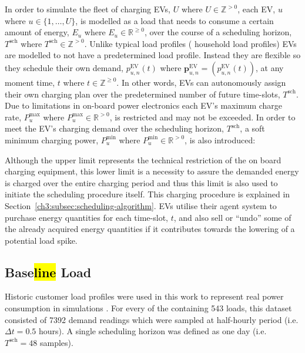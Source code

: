 In order to simulate the fleet of charging EVs, $U$ where $U \in \mathbb{Z}^{>0}$, each EV, $u$ where $u \in \{1, \dots, U\}$, is modelled as a load that needs to consume a certain amount of energy, $E_u$ where $E_u \in \mathbb{R}^{\geq0}$, over the course of a scheduling horizon, $T^\text{sch}$ where $T^\text{sch} \in \mathbb{Z}^{>0}$.
Unlike typical load profiles ( household load profiles) EVs are modelled to not have a predetermined load profile.
Instead they are flexible so they schedule their own demand, $p^\text{EV}_{u,n}(t)$ where $\textbf{p}^\text{EV}_{u,n} = (p^\text{EV}_{u,n}(t))$, at any moment time, $t$ where $t \in \mathbb{Z}^{\geq0}$.
In other words, EVs can autonomously assign their own charging plan over the predetermined number of future time-slots, $T^\text{sch}$.
Due to limitations in on-board power electronics each EV's maximum charge rate, $P^\text{max}_{u}$ where $P^\text{max}_{u} \in \mathbb{R}^{>0}$, is restricted and may not be exceeded.
In order to meet the EV's charging demand over the scheduling horizon, $T^\text{sch}$, a soft minimum charging power, $P^\text{min}_{u}$ where $P^\text{min}_{u} \in \mathbb{R}^{>0}$, is also introduced:



Although the upper limit represents the technical restriction of the on board charging equipment, this lower limit is a necessity to assure the demanded energy is charged over the entire charging period and thus this limit is also used to initiate the scheduling procedure itself.
This charging procedure is explained in Section~\ref{ch3:subsec:scheduling-algorithm}.
EVs utilise their agent system to purchase energy quantities for each time-slot, $t$, and also sell or ``undo'' some of the already acquired energy quantities if it contributes towards the lowering of a potential load spike.

\subsection{Base\hl{line} Load}


Historic customer load profiles were used in this work to represent real power consumption in simulations \cite{IrishData2002}.
For every of the containing 543 loads, this dataset consisted of 7392 demand readings which were sampled at half-hourly period (i.e. $\Delta t = 0.5$ hours).
A single scheduling horizon was defined as one day (i.e. $T^\text{sch}=48$ samples).

